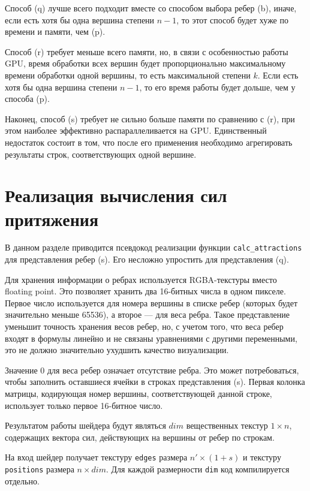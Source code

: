 Способ (q) лучше всего подходит вместе со способом выбора ребер (b), иначе, если есть хотя бы одна вершина степени $n-1$, то этот способ будет хуже по времени и памяти, чем (p).

Способ (r) требует меньше всего памяти, но, в связи с особенностью работы GPU, время обработки всех вершин будет пропорционально максимальному времени обработки одной вершины, то есть максимальной степени $k$. Если есть хотя бы одна вершина степени $n - 1$, то его время работы будет дольше, чем у способа (p).

Наконец, способ (s) требует не сильно больше памяти по сравнению с (r), при этом наиболее эффективно распараллеливается на GPU. Единственный недостаток состоит в том, что после его применения необходимо агрегировать результаты строк, соответствующих одной вершине.

\section{Реализация вычисления сил притяжения}
\label{sec:attractions_implementation}

В данном разделе приводится псевдокод реализации функции \texttt{calc\_attractions} для представления ребер (s). Его несложно упростить для представления (q).

Для хранения информации о ребрах используется RGBA-текстуры вместо floating point. Это позволяет хранить два 16-битных числа в одном пикселе. Первое число используется для номера вершины в списке ребер (которых будет значительно меньше 65536), а второе --- для веса ребра. Такое представление уменьшит точность хранения весов ребер, но, с учетом того, что веса ребер входят в формулы линейно и не связаны уравнениями с другими переменными, это не должно значительно ухудшить качество визуализации.

Значение 0 для веса ребер означает отсутствие ребра. Это может потребоваться, чтобы заполнить оставшиеся ячейки в строках представления (s). Первая колонка матрицы, кодирующая номер вершины, соответствующей данной строке, использует только первое 16-битное число.

Результатом работы шейдера будут являться $dim$ вещественных текстур $1\times n$, содержащих вектора сил, действующих на вершины от ребер по строкам.

На вход шейдер получает текстуру \texttt{edges} размера $n'\times(1 + s)$ и текстуру \texttt{positions} размера $n\times dim$. Для каждой размерности \texttt{dim} код компилируется отдельно.

